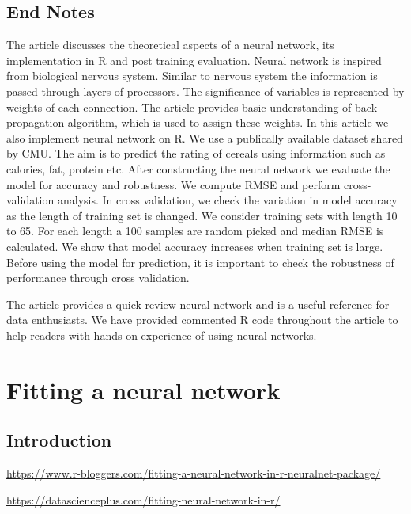 \documentclass[]{book}
\begin{document}
\hypertarget{end-notes}{%
\section{End Notes}\label{end-notes}}

The article discusses the theoretical aspects of a neural network, its implementation in R and post training evaluation. Neural network is inspired from biological nervous system. Similar to nervous system the information is passed through layers of processors. The significance of variables is represented by weights of each connection. The article provides basic understanding of back propagation algorithm, which is used to assign these weights. In this article we also implement neural network on R. We use a publically available dataset shared by CMU. The aim is to predict the rating of cereals using information such as calories, fat, protein etc. After constructing the neural network we evaluate the model for accuracy and robustness. We compute RMSE and perform cross-validation analysis. In cross validation, we check the variation in model accuracy as the length of training set is changed. We consider training sets with length 10 to 65. For each length a 100 samples are random picked and median RMSE is calculated. We show that model accuracy increases when training set is large. Before using the model for prediction, it is important to check the robustness of performance through cross validation.

The article provides a quick review neural network and is a useful reference for data enthusiasts. We have provided commented R code throughout the article to help readers with hands on experience of using neural networks.

\hypertarget{fitting-a-neural-network}{%
\chapter{Fitting a neural network}\label{fitting-a-neural-network}}

\hypertarget{introduction-1}{%
\section{Introduction}\label{introduction-1}}

\url{https://www.r-bloggers.com/fitting-a-neural-network-in-r-neuralnet-package/}

\url{https://datascienceplus.com/fitting-neural-network-in-r/}
\end{document}
